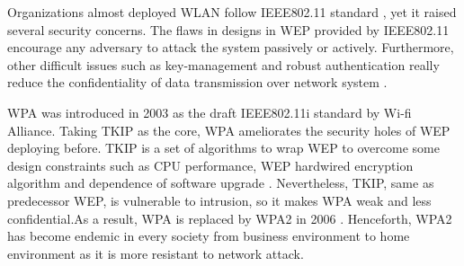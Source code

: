 Organizations almost deployed \ac{WLAN} follow \ac{IEEE}802.11 standard \cite{ieee1999802}, yet it raised several security concerns. The flaws in designs in \ac{WEP} provided by \ac{IEEE}802.11 encourage any adversary to attack the system passively or actively. Furthermore, other difficult issues such as key-management and robust authentication really reduce the confidentiality of data transmission over network system \cite{arbaugh2002your}.

\ac{WPA} was introduced in 2003 \cite{fitzpatrick_2016} as the draft \ac{IEEE}802.11i standard by Wi-fi Alliance. Taking \ac{TKIP} as the core, \ac{WPA} ameliorates the security holes of \ac{WEP} deploying before. \ac{TKIP} is a set of algorithms to wrap \ac{WEP} to overcome some design constraints such as \ac{CPU} performance, \ac{WEP} hardwired encryption algorithm and dependence of software upgrade \cite{doomun2012modified}. Nevertheless, \ac{TKIP}, same as predecessor \ac{WEP}, is vulnerable to intrusion, so it makes \ac{WPA} weak and less confidential.As a result, \ac{WPA} is replaced by \ac{WPA}2 in 2006 \cite{fitzpatrick_2016}. Henceforth, \ac{WPA}2 has become endemic in every society from business environment to home environment as it is more resistant to network attack.

